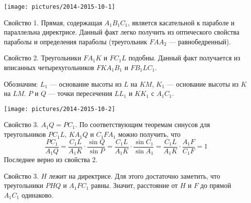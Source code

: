 \documentclass[11pt, a4paper]{article}
\begin{document}
\begin{enumerate}
\begin{center}
\texttt{[image: pictures/2014-2015-10-1]}
\end{center}

Свойство 1. Прямая, содержащая $A_1B_1C_1$, является касательной к параболе и параллельна директрисе. Данный факт легко получить из оптического свойства параболы и определения параболы (треугольник $FAA_2$ --- равнобедренный).

Свойство 2. Треугольники $FA_1K$ и $FC_1L$ подобны. Данный факт получается из вписанных четырехугольников $FKA_1B_1$ и $FB_1LC_1$.

Обозначим: $L_1$ --- основание высоты из $L$ на $KM$, $K_1$ --- основание высоты из $K$ на $LM$. $P$ и $Q$ --- точки пересечения $LL_1$ и $KK_1$ с $A_1C_1$.

\begin{center}
\texttt{[image: pictures/2014-2015-10-2]}
\end{center}

Свойство 3. $A_1Q = PC_1$. По соответствующим теоремам синусов для треугольников $PC_1L$, $KA_1Q$ и $C_1FA_1$ можно получить, что 
$$ \frac{PC_1}{A_1Q} = \frac{C_1L}{A_1K} \cdot \frac{\sin Q}{\sin P} = \frac{C_1L}{A_1K} \cdot \frac{\sin C_1}{\sin A_1} = \frac{C_1L}{A_1K} \cdot \frac{A_1F}{C_1F} = 1$$
Последнее верно из свойства 2.

Свойство 3. $H$ лежит на директрисе. Для этого достаточно заметить, что треугольники $PHQ$ и $A_1FC_1$ равны. Значит, расстояние от $H$ и $F$ до прямой $A_1C_1$ одинаково.


\end{enumerate}
\end{document}

